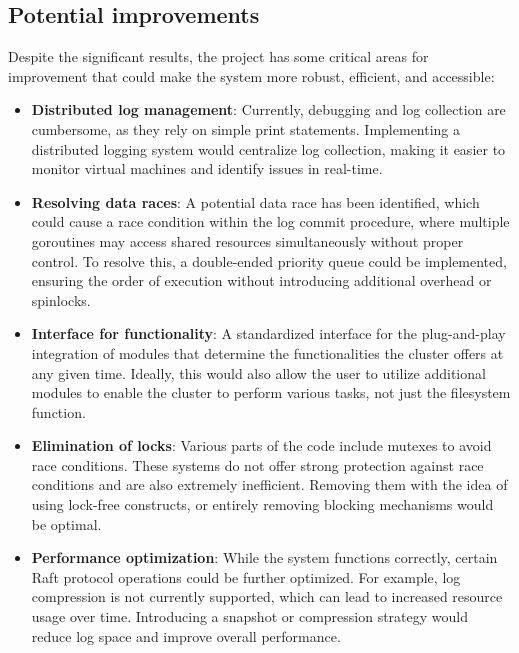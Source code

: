 \subsection{Potential improvements}
Despite the significant results, the project has some critical areas for improvement 
that could make the system more robust, efficient, and accessible:
\begin{itemize}
  \item \textbf{Distributed log management}: Currently, debugging and log collection 
    are cumbersome, as they rely on simple print statements. Implementing a 
    distributed logging system would centralize log collection, making it easier 
    to monitor virtual machines and identify issues in real-time.

  \item \textbf{Resolving data races}: A potential data race has been identified, 
    which could cause a race condition within the log commit procedure, where 
    multiple goroutines may access shared resources simultaneously without proper control. 
    To resolve this, a double-ended priority queue could be implemented, ensuring 
    the order of execution without introducing additional overhead or spinlocks.

  \item \textbf{Interface for functionality}: A standardized interface for the plug-and-play 
    integration of modules that determine the functionalities the cluster offers at any given 
    time. Ideally, this would also allow the user to utilize additional modules to enable 
    the cluster to perform various tasks, not just the filesystem function.

  \item \textbf{Elimination of locks}: Various parts of the code include mutexes to avoid 
    race conditions. These systems do not offer strong protection against race conditions 
    and are also extremely inefficient. Removing them with the idea of using lock-free constructs,
    or entirely removing blocking mechanisms would be optimal.

  \item \textbf{Performance optimization}: While the system functions correctly, 
    certain Raft protocol operations could be further optimized. For example, 
    log compression is not currently supported, which can lead to increased 
    resource usage over time. Introducing a snapshot or compression strategy 
    would reduce log space and improve overall performance.


\end{itemize}
